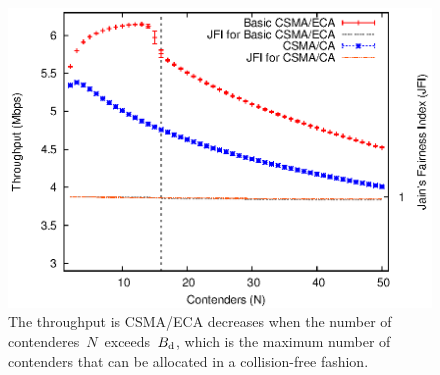 
\begin{figure}[htbp]
  \centering
  \includegraphics[width=0.95\linewidth]{figures/errorPlots/ECA-vs-CA-FINAL.eps}
  \caption{The throughput is CSMA/ECA decreases when the number of contenderes~$N$~exceeds~$B_{\mbox{\scriptsize{d}}}$, which is the maximum number of contenders that can be allocated in a collision-free fashion.
  \label{fig:throughput}}
\end{figure}